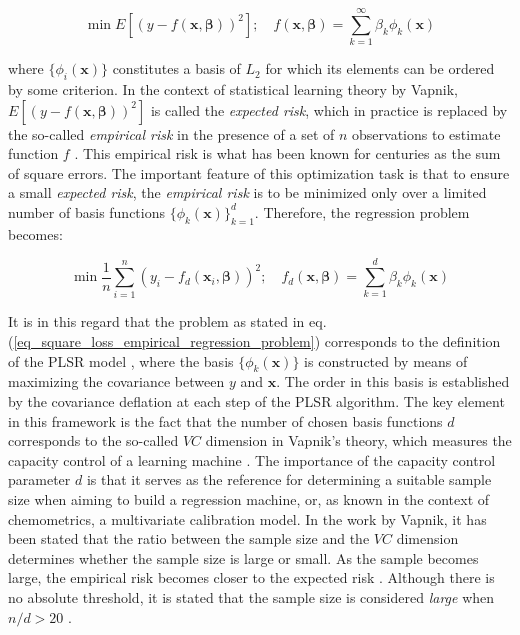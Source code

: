 \documentclass[journal=ancham,manuscript=article]{achemso}
\begin{document}
\begin{equation}
    \min E \left[ (y-f(\mathbf{x}, \boldsymbol{\beta}))^2\right]; \quad f(\mathbf{x}, \boldsymbol{\beta}) = \sum_{k=1}^{\infty} \beta_k \phi_{k}(\mathbf{x})
    \label{eq_general_regression_problem}
\end{equation}

where $\{\phi_{i}(\mathbf{x})\}$ constitutes a basis of $L_2$ for which its elements can be ordered by some criterion. In the context of statistical learning theory by Vapnik, $E \left[ (y-f(\mathbf{x}, \boldsymbol{\beta}))^2\right]$ is called the \emph{expected risk}, which in practice is replaced by the so-called \emph{empirical risk} in the presence of a set of $n$ observations to estimate function $f$ \cite{Vapnik2000}. This empirical risk is what has been known for centuries as the sum of square errors. The important feature of this optimization task is that to ensure a small \emph{expected risk}, the \emph{empirical risk} is to be minimized only over a limited number of basis functions $\{\phi_{k}(\mathbf{x})\}_{k=1}^d$. Therefore, the regression problem becomes:

\begin{equation}
    \min \frac{1}{n} \sum_{i=1}^n (y_i-f_d(\mathbf{x}_i, \boldsymbol{\beta}))^2; \quad f_d(\mathbf{x}, \boldsymbol{\beta}) = \sum_{k=1}^{d} \beta_k \phi_{k}(\mathbf{x})
    \label{eq_square_loss_empirical_regression_problem}
\end{equation}

It is in this regard that the problem as stated in eq. (\ref{eq_square_loss_empirical_regression_problem}) corresponds to the definition of the PLSR model  \cite{Stone1990}, where the basis $\{\phi_{k}(\mathbf{x})\}$ is constructed by means of maximizing the covariance between $y$ and $\mathbf{x}$. The order in this basis is established by the covariance deflation at each step of the PLSR algorithm. The key element in this framework is the fact that the number of chosen basis functions $d$ corresponds to the so-called $VC$ dimension in Vapnik's theory, which measures the capacity control of a learning machine \cite{Vapnik2019}. The importance of the capacity control parameter $d$ is that it serves as the reference for determining a suitable sample size when aiming to build a regression machine, or, as known in the context of chemometrics, a multivariate calibration model. In the work by Vapnik, it has been stated that the ratio between the sample size and the $VC$ dimension determines whether the sample size is large or small. As the sample becomes large, the empirical risk becomes closer to the expected risk \cite{Vapnik2000}. Although there is no absolute threshold, it is stated that the sample size is considered \emph{large} when  $n/d>20$ \cite{Vapnik2000}.
\end{document}

